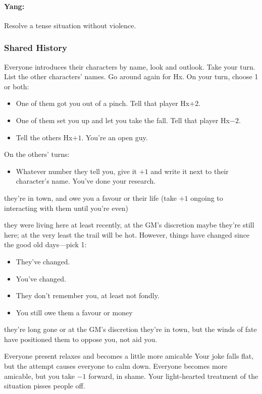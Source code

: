 \paragraph{Yang:} Resolve a tense situation without violence.

\subsubsection{Shared History}
Everyone introduces their characters by name, look and outlook. Take
your turn.  List the other characters' names.  Go around again for
Hx. On your turn, choose 1 or both:
\begin{itemize}
\item One of them got you out of a pinch. Tell that player Hx$+2$.
\item One of them set you up and let you take the fall. Tell that player Hx$-2$.
\item Tell the others Hx$+1$. You're an open guy.
\end{itemize}
On the others’ turns:
\begin{itemize}
\item Whatever number they tell you, give it $+1$ and write it next to
  their character’s name. You've done your research.
\end{itemize}

{they're in town, and owe you a favour or their life (take $+1$ ongoing to interacting with them until you're even)}
{they were living here at least recently, at the GM's discretion maybe they're still here; at the very least the trail will be hot. However, things have changed since the good old days---pick 1:
\begin{itemize}
\item They've changed.
\item You've changed.
\item They don't remember you, at least not fondly.
\item You still owe them a favour or money
\end{itemize}}
{they're long gone or at the GM's discretion they're in town, but the winds of fate have positioned them to oppose you, not aid you.}

{Everyone present relaxes and becomes a little more amicable}
{Your joke falls flat, but the attempt causes everyone to calm down. Everyone becomes more amicable, but you take $-1$ forward, in shame.}
{Your light-hearted treatment of the situation pisses people off.}

